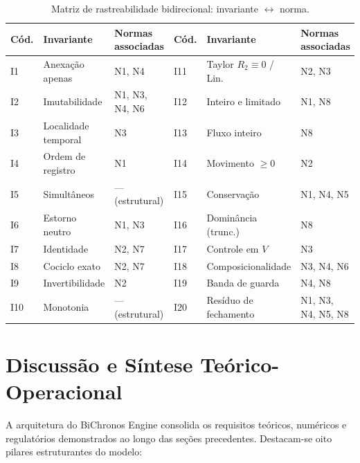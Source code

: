 \documentclass[11pt, a4paper]{article}
\theoremstyle{definition}
\theoremstyle{plain}
\theoremstyle{remark}
\begin{document}
\begin{table}[htbp]
\centering
\small
\setlength{\tabcolsep}{4.5pt}
\begin{tabular}{@{}lll@{\hspace{1.2em}}lll@{}}
\toprule
\textbf{Cód.} & \textbf{Invariante} & \textbf{Normas associadas} & \textbf{Cód.} & \textbf{Invariante} & \textbf{Normas associadas} \\
\midrule
I1  & Anexação apenas     & N1, N4           & I11 & Taylor $R_2\equiv 0$ / Lin. & N2, N3 \\
I2  & Imutabilidade       & N1, N3, N4, N6   & I12 & Inteiro e limitado          & N1, N8 \\
I3  & Localidade temporal & N3               & I13 & Fluxo inteiro               & N8 \\
I4  & Ordem de registro   & N1               & I14 & Movimento $\ge 0$           & N2 \\
I5  & Simultâneos         & --- (estrutural) & I15 & Conservação                 & N1, N4, N5 \\
I6  & Estorno neutro      & N1, N3           & I16 & Dominância (trunc.)         & N8 \\
I7  & Identidade          & N2, N7           & I17 & Controle em $V$             & N3 \\
I8  & Cociclo exato       & N2, N7           & I18 & Composicionalidade          & N3, N4, N6 \\
I9  & Invertibilidade     & N2               & I19 & Banda de guarda             & N4, N8 \\
I10 & Monotonia           & --- (estrutural) & I20 & Resíduo de fechamento       & N1, N3, N4, N5, N8 \\
\bottomrule
\end{tabular}
\caption{Matriz de rastreabilidade bidirecional: invariante $\leftrightarrow$ norma.}
\label{tab:10}
\end{table}

\section{Discussão e Síntese Teórico-Operacional}\label{sec:discussao}

A arquitetura do BiChronos Engine consolida os requisitos teóricos, numéricos e regulatórios demonstrados ao longo das seções precedentes. Destacam-se oito pilares estruturantes do modelo:
\end{document}
